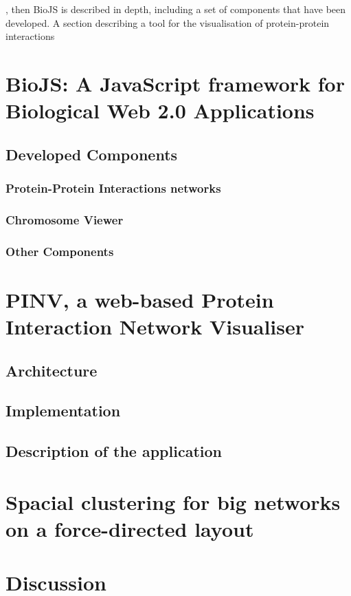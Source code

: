 

, then BioJS is described in depth, including a set of components that have been developed. A section describing a tool for the visualisation of protein-protein interactions 


\section{BioJS: A JavaScript framework for Biological Web 2.0 Applications }
\subsection{Developed Components}
\subsubsection{Protein-Protein Interactions networks}
\subsubsection{Chromosome Viewer}
\subsubsection{Other Components}

\section{PINV, a web-based Protein Interaction Network Visualiser }  \label{section:pinv}
\subsection{Architecture}
\subsection{Implementation}
\subsection{Description of the application}

\section{Spacial clustering for big networks on a force-directed layout}

\section{Discussion}


